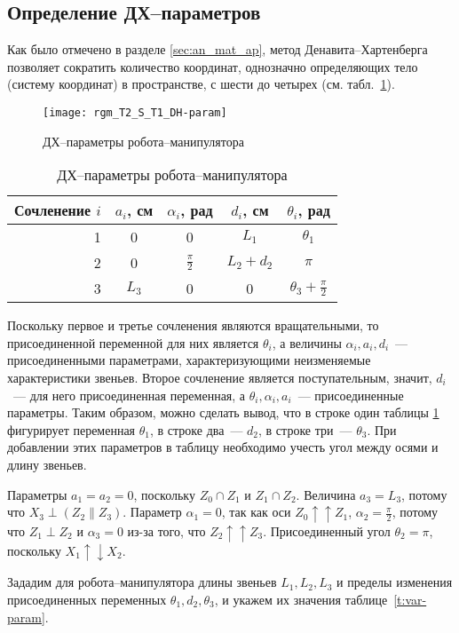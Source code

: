 \documentclass[oneside, final, 14pt]{extarticle}
\begin{document}
\subsection{Определение ДХ--параметров}

Как было отмечено в разделе \ref{sec:an_mat_ap}, метод Денавита--Хартенберга позволяет сократить количество координат, однозначно определяющих тело (систему координат) в пространстве, с шести до четырех (см. табл.~\ref{t:dh-param}).

\begin{figure}[h]
  \centering
  \texttt{[image: rgm\_T2\_S\_T1\_DH-param]}
  \caption{ДХ--параметры робота--манипулятора}
  \label{i:rgm_T2_S_T1_DH-param}
\end{figure}
\par

\begin{table}[t]
\centering
\begin{tabular}{|r|c|c|c|c|}
  \hline Сочленение \(i\) & \(a_i\), см & \(\alpha_i\), рад & \(d_i\), см & \(\theta_i\), рад \\ \hline
  1 & 0 & 0 & \(L_1\) & \(\theta_1\) \\ \hline
  2 & 0 & \(\frac{\pi}{2}\) & \(L_2+ d_2\) & \(\pi\) \\ \hline
  3 & \(L_3\) & 0 & 0 & \(\theta_3 + \frac{\pi}{2}\) \\ \hline
\end{tabular}
\caption{ДХ--параметры робота--манипулятора}
\label{t:dh-param}
\end{table}

Поскольку первое и третье сочленения являются вращательными, то присоединенной переменной для них является \(\theta_i\), а величины \(\alpha_i, a_i, d_i\)~--- присоединенными параметрами, характеризующими неизменяемые характеристики звеньев.
Второе сочленение является поступательным, значит, \(d_i\)~--- для него присоединенная переменная, а \(\theta_i, \alpha_i, a_i\)~--- присоединенные параметры.
Таким образом, можно сделать вывод, что в строке один таблицы \ref{t:dh-param} фигурирует переменная \(\theta_1\), в строке два~--- \(d_2\), в строке три~--- \(\theta_3\). При добавлении этих параметров в таблицу необходимо учесть угол между осями и длину звеньев.
\par
Параметры \(a_1 = a_2 = 0\), поскольку \(Z_0 \cap Z_1\) и \(Z_1 \cap Z_2\).
Величина \(a_3 = L_3\), потому что \(X_3 \perp (Z_2 \| Z_3)\).
Параметр \(\alpha_1 = 0\), так как оси \(Z_0 \uparrow\uparrow Z_1\), \(\alpha_2 = \frac{\pi}{2}\), потому что \(Z_1 \perp Z_2\) и \(\alpha_3 = 0\) из-за того, что \(Z_2 \uparrow \uparrow Z_3\).
Присоединенный угол \(\theta_2 = \pi\), поскольку \(X_1 \uparrow \downarrow X_2\).
\par
Зададим для робота--манипулятора длины звеньев \(L_1, L_2, L_3\) и пределы изменения присоединенных переменных \(\theta_1, d_2, \theta_3\), и укажем их значения таблице~\ref{t:var-param}.
\end{document}
